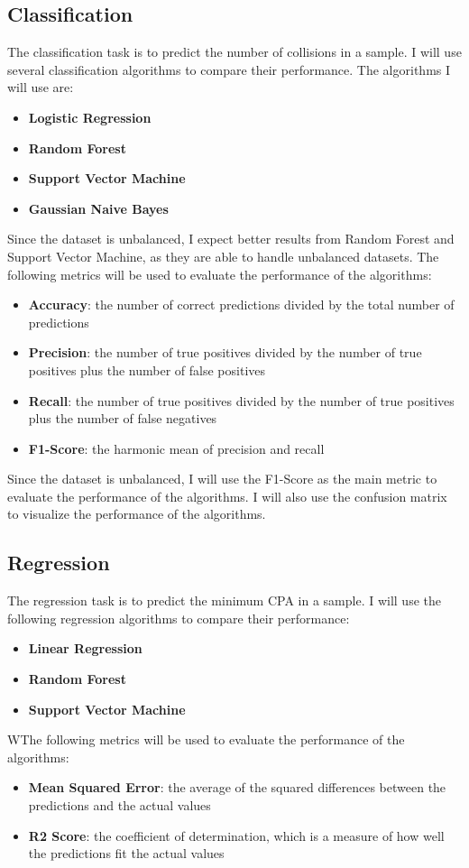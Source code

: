 \subsection{Classification}
The classification task is to predict the number of collisions in a sample. I will use several classification algorithms to compare their performance. The algorithms I will use are:
\begin{itemize}
    \item \textbf{Logistic Regression}
    \item \textbf{Random Forest}
    \item \textbf{Support Vector Machine}
    \item \textbf{Gaussian Naive Bayes}
\end{itemize}
Since the dataset is unbalanced, I expect better results from Random Forest and Support Vector Machine, as they are able to handle unbalanced datasets.
The following metrics will be used to evaluate the performance of the algorithms:
\begin{itemize}
    \item \textbf{Accuracy}: the number of correct predictions divided by the total number of predictions
    \item \textbf{Precision}: the number of true positives divided by the number of true positives plus the number of false positives
    \item \textbf{Recall}: the number of true positives divided by the number of true positives plus the number of false negatives
    \item \textbf{F1-Score}: the harmonic mean of precision and recall
\end{itemize}
Since the dataset is unbalanced, I will use the F1-Score as the main metric to evaluate the performance of the algorithms. I will also use the confusion matrix to visualize the performance of the algorithms.

\subsection{Regression}
The regression task is to predict the minimum CPA in a sample. I will use the following regression algorithms to compare their performance:
\begin{itemize}
    \item \textbf{Linear Regression}
    \item \textbf{Random Forest}
    \item \textbf{Support Vector Machine}
\end{itemize}
WThe following metrics will be used to evaluate the performance of the algorithms:
\begin{itemize}
    \item \textbf{Mean Squared Error}: the average of the squared differences between the predictions and the actual values
    \item \textbf{R2 Score}: the coefficient of determination, which is a measure of how well the predictions fit the actual values
\end{itemize}
